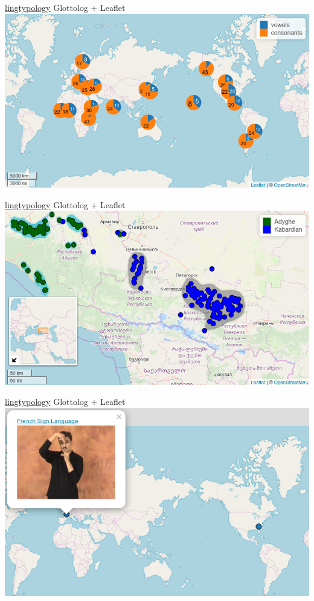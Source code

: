 \documentclass[13pt, t]{beamer}
\begin{document}
\begin{frame}{\href{https://ropensci.github.io/lingtypology/}{lingtypology}}
\alert{\large Glottolog + Leaflet}\\
\vfill
\includegraphics[width=\linewidth]{images/04-minicharts}
\end{frame}

\begin{frame}{\href{https://ropensci.github.io/lingtypology/}{lingtypology}}
\alert{\large Glottolog + Leaflet}\\
\vfill
\includegraphics[width=\linewidth]{images/05-density}
\end{frame}

\begin{frame}{\href{https://ropensci.github.io/lingtypology/}{lingtypology}}
\alert{\large Glottolog + Leaflet}\\
\vfill
\includegraphics[width=\linewidth]{images/06-sign}
\end{frame}
\end{document}
